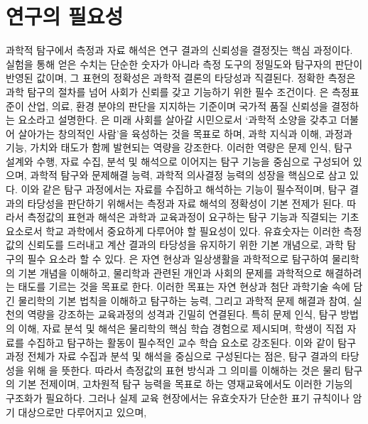 \section{연구의 필요성}

과학적 탐구에서 측정과 자료 해석은 연구 결과의 신뢰성을 결정짓는 핵심 과정이다.
실험을 통해 얻은 수치는 단순한 숫자가 아니라 측정 도구의 정밀도와 탐구자의 판단이 반영된 값이며,
그 표현의 정확성은 과학적 결론의 타당성과 직결된다.
%
정확한 측정은 과학 탐구의 절차를 넘어 사회가 신뢰를 갖고 기능하기 위한 필수 조건이다.
은 측정표준이 산업, 의료, 환경 분야의 판단을 지지하는 기준이며 국가적 품질
신뢰성을 결정하는 요소라고 설명한다.
%
은 미래 사회를 살아갈 시민으로서
`과학적 소양을 갖추고 더불어 살아가는 창의적인 사람'을 육성하는 것을 목표로 하며,
과학 지식과 이해, 과정과 기능, 가치와 태도가 함께 발현되는 역량을 강조한다.
%
이러한 역량은 문제 인식, 탐구 설계와 수행, 자료 수집, 분석 및 해석으로 이어지는 탐구 기능을
중심으로 구성되어 있으며, 과학적 탐구와 문제해결 능력, 과학적 의사결정 능력의
성장을 핵심으로 삼고 있다.
%
이와 같은 탐구 과정에서는 자료를 수집하고 해석하는 기능이 필수적이며,
탐구 결과의 타당성을 판단하기 위해서는 측정과 자료 해석의 정확성이 기본 전제가 된다.
%
따라서 측정값의 표현과 해석은 과학과 교육과정이 요구하는 탐구 기능과 직결되는
기초 요소로서 학교 과학에서 중요하게 다루어야 할 필요성이 있다.
%
유효숫자는 이러한 측정값의 신뢰도를 드러내고 계산 결과의 타당성을 유지하기 위한 기본 개념으로,
과학 탐구의 필수 요소라 할 수 있다.
%
은 자연 현상과 일상생활을 과학적으로 탐구하여
물리학의 기본 개념을 이해하고, 물리학과 관련된 개인과 사회의 문제를 과학적으로 해결하려는
태도를 기르는 것을 목표로 한다.
%
이러한 목표는 자연 현상과 첨단 과학기술 속에 담긴 물리학의 기본 법칙을 이해하고
탐구하는 능력, 그리고 과학적 문제 해결과 참여, 실천의 역량을 강조하는 교육과정의
성격과 긴밀히 연결된다.
%
특히 문제 인식, 탐구 방법의 이해, 자료 분석 및 해석은 물리학의 핵심 학습 경험으로 제시되며,
학생이 직접 자료를 수집하고 탐구하는 활동이 필수적인 교수 학습 요소로 강조된다.
%
이와 같이 탐구 과정 전체가 자료 수집과 분석 및 해석을 중심으로 구성된다는 점은,
탐구 결과의 타당성을 위해 을 뜻한다.
%
따라서 측정값의 표현 방식과 그 의미를 이해하는 것은 물리 탐구의 기본 전제이며,
고차원적 탐구 능력을 목표로 하는 영재교육에서도 이러한 기능의 구조화가 필요하다.
%
그러나 실제 교육 현장에서는 유효숫자가 단순한 표기 규칙이나 암기 대상으로만 다루어지고 있으며,
